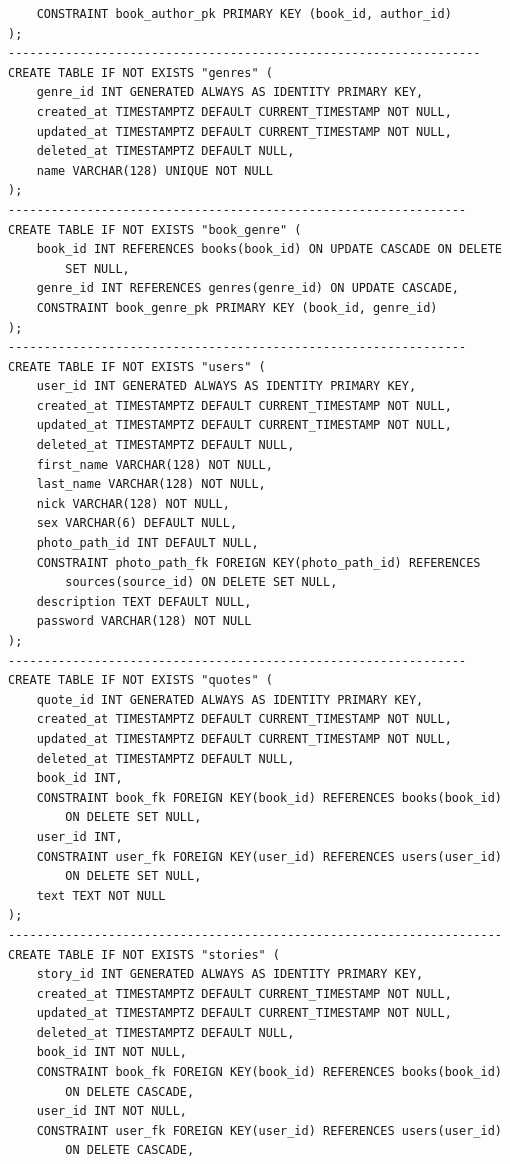 \documentclass[a4paper,12pt]{article}
\begin{document}
\begin{lstlisting}
    CONSTRAINT book_author_pk PRIMARY KEY (book_id, author_id)
);
------------------------------------------------------------------
CREATE TABLE IF NOT EXISTS "genres" (
    genre_id INT GENERATED ALWAYS AS IDENTITY PRIMARY KEY,
    created_at TIMESTAMPTZ DEFAULT CURRENT_TIMESTAMP NOT NULL,
    updated_at TIMESTAMPTZ DEFAULT CURRENT_TIMESTAMP NOT NULL,
    deleted_at TIMESTAMPTZ DEFAULT NULL,
    name VARCHAR(128) UNIQUE NOT NULL
);
----------------------------------------------------------------
CREATE TABLE IF NOT EXISTS "book_genre" (
    book_id INT REFERENCES books(book_id) ON UPDATE CASCADE ON DELETE 
        SET NULL,
    genre_id INT REFERENCES genres(genre_id) ON UPDATE CASCADE,
    CONSTRAINT book_genre_pk PRIMARY KEY (book_id, genre_id)
);
----------------------------------------------------------------
CREATE TABLE IF NOT EXISTS "users" (
    user_id INT GENERATED ALWAYS AS IDENTITY PRIMARY KEY,
    created_at TIMESTAMPTZ DEFAULT CURRENT_TIMESTAMP NOT NULL,
    updated_at TIMESTAMPTZ DEFAULT CURRENT_TIMESTAMP NOT NULL,
    deleted_at TIMESTAMPTZ DEFAULT NULL,
    first_name VARCHAR(128) NOT NULL,
    last_name VARCHAR(128) NOT NULL,
    nick VARCHAR(128) NOT NULL,
    sex VARCHAR(6) DEFAULT NULL,
    photo_path_id INT DEFAULT NULL,
    CONSTRAINT photo_path_fk FOREIGN KEY(photo_path_id) REFERENCES
        sources(source_id) ON DELETE SET NULL,
    description TEXT DEFAULT NULL,
    password VARCHAR(128) NOT NULL
);
----------------------------------------------------------------
CREATE TABLE IF NOT EXISTS "quotes" (
    quote_id INT GENERATED ALWAYS AS IDENTITY PRIMARY KEY,
    created_at TIMESTAMPTZ DEFAULT CURRENT_TIMESTAMP NOT NULL,
    updated_at TIMESTAMPTZ DEFAULT CURRENT_TIMESTAMP NOT NULL,
    deleted_at TIMESTAMPTZ DEFAULT NULL,
    book_id INT,
    CONSTRAINT book_fk FOREIGN KEY(book_id) REFERENCES books(book_id) 
        ON DELETE SET NULL,
    user_id INT,
    CONSTRAINT user_fk FOREIGN KEY(user_id) REFERENCES users(user_id) 
        ON DELETE SET NULL,
    text TEXT NOT NULL
);
---------------------------------------------------------------------
CREATE TABLE IF NOT EXISTS "stories" (
    story_id INT GENERATED ALWAYS AS IDENTITY PRIMARY KEY,
    created_at TIMESTAMPTZ DEFAULT CURRENT_TIMESTAMP NOT NULL,
    updated_at TIMESTAMPTZ DEFAULT CURRENT_TIMESTAMP NOT NULL,
    deleted_at TIMESTAMPTZ DEFAULT NULL,
    book_id INT NOT NULL,
    CONSTRAINT book_fk FOREIGN KEY(book_id) REFERENCES books(book_id) 
        ON DELETE CASCADE,
    user_id INT NOT NULL,
    CONSTRAINT user_fk FOREIGN KEY(user_id) REFERENCES users(user_id) 
        ON DELETE CASCADE,

\end{lstlisting}
\end{document}
